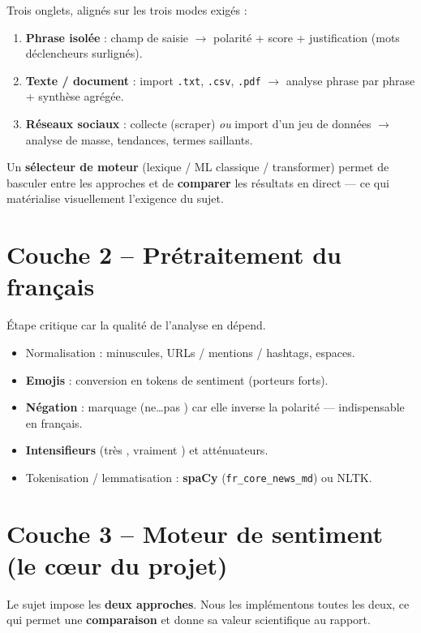 \documentclass[11pt,a4paper]{article}
\newcommand{\code}[1]{\texttt{\small #1}}
\begin{document}
Trois onglets, alignés sur les trois modes exigés :
\begin{enumerate}[leftmargin=1.2cm,nosep]
  \item \textbf{Phrase isolée} : champ de saisie $\rightarrow$ polarité + score
        + justification (mots déclencheurs surlignés).
  \item \textbf{Texte / document} : import \code{.txt}, \code{.csv}, \code{.pdf}
        $\rightarrow$ analyse phrase par phrase + synthèse agrégée.
  \item \textbf{Réseaux sociaux} : collecte (scraper) \emph{ou} import d'un jeu
        de données $\rightarrow$ analyse de masse, tendances, termes saillants.
\end{enumerate}
Un \textbf{sélecteur de moteur} (lexique / ML classique / transformer) permet de
basculer entre les approches et de \textbf{comparer} les résultats en direct ---
ce qui matérialise visuellement l'exigence du sujet.

\section{Couche 2 -- Prétraitement du français}

Étape critique car la qualité de l'analyse en dépend.
\begin{itemize}[leftmargin=1.2cm,nosep]
  \item Normalisation : minuscules, URLs / mentions / hashtags, espaces.
  \item \textbf{Emojis} : conversion en tokens de sentiment (porteurs forts).
  \item \textbf{Négation} : marquage (\og ne\dots pas \fg{}) car elle inverse la
        polarité --- indispensable en français.
  \item \textbf{Intensifieurs} (\og très \fg{}, \og vraiment \fg{}) et atténuateurs.
  \item Tokenisation / lemmatisation : \textbf{spaCy} (\code{fr\_core\_news\_md})
        ou NLTK.
\end{itemize}

\section{Couche 3 -- Moteur de sentiment (le c\oe ur du projet)}

Le sujet impose les \textbf{deux approches}. Nous les implémentons toutes les
deux, ce qui permet une \textbf{comparaison} et donne sa valeur scientifique au
rapport.
\end{document}
